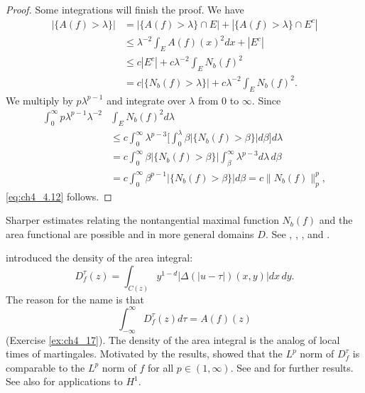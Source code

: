 \begin{proof}
Some integrations will finish the proof. We have
\begin{align*}
    |\{A(f) > \lambda\}| &= |\{A(f) > \lambda\} \cap E| + |\{A(f) > \lambda\} \cap E^c| \\
    &\leq \lambda^{-2} \int_E A(f)(x)^2dx + |E^c| \\
    &\leq c|E^c| + c\lambda^{-2} \int_E N_b(f)^2 \\
    &= c|\{N_b(f) > \lambda\}| + c\lambda^{-2} \int_E N_b(f)^2.
\end{align*}
We multiply by $p\lambda^{p-1}$ and integrate over $\lambda$ from $0$ to $\infty$. Since
\begin{align*}
    \int_0^\infty p\lambda^{p-1}\lambda^{-2} &\int_E N_b(f)^2d\lambda \\
    &\leq c \int_0^\infty \lambda^{p-3}\Big[\int_0^\lambda \beta|\{N_b(f) > \beta\}|d\beta\Big]d\lambda \\
    &= c \int_0^\infty \beta|\{N_b(f) > \beta\}| \int_\beta^\infty \lambda^{p-3}d\lambda\,d\beta \\
    &= c \int_0^\infty \beta^{p-1}|\{N_b(f) > \beta\}|d\beta = c\|N_b(f)\|_p^p,
\end{align*}
\eqref{eq:ch4_4.12} follows.
\end{proof}


Sharper estimates relating the nontangential maximal function $N_b(f)$ and the area functional are possible and in more general domains $D$. See \cite{BanuelosBrossard1993}, \cite{BanuelosMoore1989c,BanuelosMoore1991}, \cite{BurkholderGundy1972}, and \cite{Davis1991}.

\cite{GundySilverstein1985} introduced the density of the area integral:
\[
    D_f^\tau(z) = \int_{C(z)} y^{1-d}\big|\Delta(|u-\tau|)(x,y)\big|dx\,dy.
\]
The reason for the name is that
\mpagebreak
\begin{equation}\label{eq:ch4_4.14}
    \int_{-\infty}^\infty D_f^\tau(z)d\tau = A(f)(z)
\end{equation}
(Exercise \ref{ex:ch4_17}). The density of the area integral is the analog of local times of martingales. Motivated by the \cite{BarlowYor1981} results, \cite{GundySilverstein1985} showed that the $L^p$ norm of $D_f^\tau$ is comparable to the $L^p$ norm of $f$ for all $p \in (1,\infty)$. See \cite{BanuelosBrossard1993} and \cite{BanuelosMoore1991} for further results. See also \cite{BrossardChevalier1988} for applications to $H^1$.

